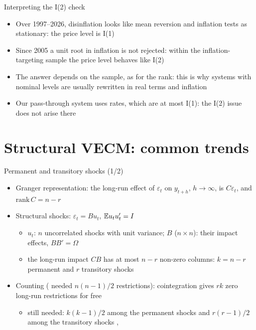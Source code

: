 \begin{frame}{Interpreting the I(2) check}
\itemsize{\small}
\begin{itemize}
    \item Over 1997--2026, disinflation looks like mean reversion and inflation tests as stationary: the price level is I(1)
    \item Since 2005 a unit root in inflation is not rejected: within the inflation-targeting sample the price level behaves like I(2)
    \item The answer depends on the sample, as for the rank: this is why systems with nominal levels are usually rewritten in real terms and inflation
    \item Our pass-through system uses rates, which are at most I(1): the I(2) issue does not arise there
\end{itemize}
\end{frame}


\section{Structural VECM: common trends}

\begin{frame}{Permanent and transitory shocks (1/2)}
\itemsize{\small}
\begin{itemize}
    \item Granger representation: the long-run effect of $\varepsilon_t$ on $y_{t+h}$, $h \to \infty$, is $C\varepsilon_t$, and $\mathrm{rank}\,C = n - r$
    \item Structural shocks: $\varepsilon_t = Bu_t$, $\mathbb{E} u_tu_t' = I$
    \begin{itemize}
        \item $u_t$: $n$ uncorrelated shocks with unit variance; $B$ ($n\times n$): their impact effects, $BB' = \Omega$
        \item the long-run impact $CB$ has at most $n - r$ non-zero columns: $k = n - r$ permanent and $r$ transitory shocks
    \end{itemize}
    \item Counting ( needed $n(n - 1)/2$ restrictions): cointegration gives $rk$ zero long-run restrictions for free
    \begin{itemize}
        \item still needed: $k(k - 1)/2$ among the permanent shocks and $r(r - 1)/2$ among the transitory shocks , 
    \end{itemize}
\end{itemize}
\end{frame}

